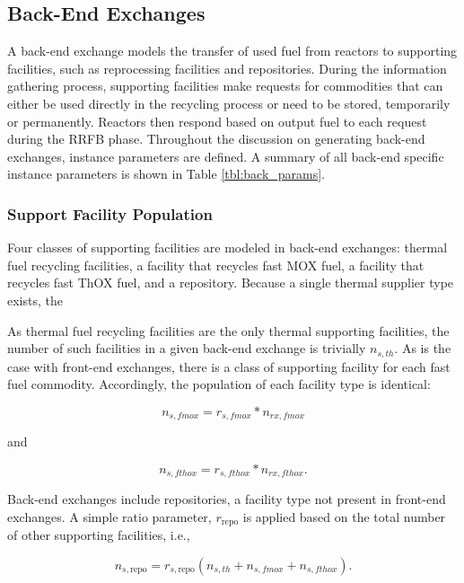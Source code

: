 \subsection{Back-End Exchanges}\label{method:setup:back}

A back-end exchange models the transfer of used fuel from reactors to supporting
facilities, such as reprocessing facilities and repositories. During the
information gathering process, supporting facilities make requests for
commodities that can either be used directly in the recycling process or need to
be stored, temporarily or permanently. Reactors then respond based on output
fuel to each request during the RRFB phase. Throughout the discussion on
generating back-end exchanges, instance parameters are defined. A summary of all
back-end specific instance parameters is shown in Table \ref{tbl:back_params}.

\subsubsection{Support Facility Population}\label{method:setup:back:sup}

Four classes of supporting facilities are modeled in back-end exchanges: thermal
fuel recycling facilities, a facility that recycles fast MOX fuel, a facility
that recycles fast ThOX fuel, and a repository. Because a single thermal supplier type exists, the 

As thermal fuel recycling facilities are the only thermal supporting facilities,
the number of such facilities in a given back-end exchange is trivially $n_{s,
  th}$. As is the case with front-end exchanges, there is a class of supporting
facility for each fast fuel commodity. Accordingly, the population of each
facility type is identical:

\begin{equation}
n_{s, fmox} = r_{s, fmox} * n_{rx, fmox}
\end{equation}

and

\begin{equation}
n_{s, fthox} = r_{s, fthox} * n_{rx, fthox}.
\end{equation}

Back-end exchanges include repositories, a facility type not present in
front-end exchanges. A simple ratio parameter, $r_{\text{repo}}$ is applied
based on the total number of other supporting facilities, i.e.,

\begin{equation}
n_{s, \text{repo}} = r_{s, \text{repo}} ( n_{s, th} + n_{s, fmox} +n_{s, fthox} ).
\end{equation}

